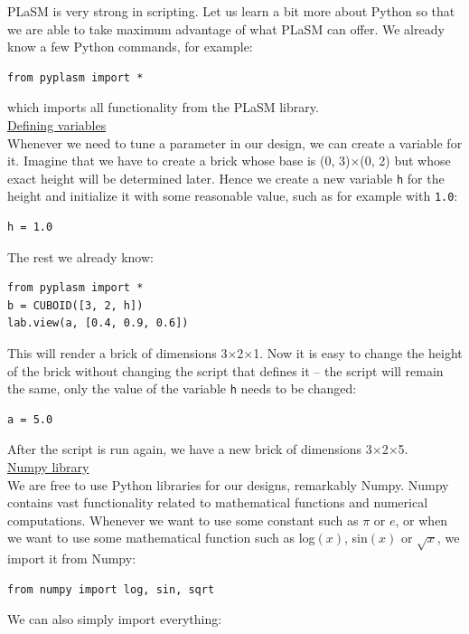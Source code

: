 \documentclass{article}
\begin{document}
PLaSM is very strong in scripting. Let us learn a bit 
more about Python so that we are able to take maximum advantage 
of what PLaSM can offer. We already know a few Python commands, 
for example:

\begin{verbatim}
from pyplasm import *
\end{verbatim} 
which imports all functionality from the PLaSM library.\\

\noindent
\underline{Defining variables}\\

\noindent
Whenever we need to tune a parameter in our design, we can create 
a variable for it. Imagine that we have to create a brick whose base
is (0, 3)$\times$(0, 2) but whose exact height will be determined 
later. Hence  we create a new variable {\tt h} for the height and initialize 
it with some reasonable value, such as for example with {\tt 1.0}:

\begin{verbatim}
h = 1.0
\end{verbatim} 
The rest we already know:

\begin{verbatim}
from pyplasm import *
b = CUBOID([3, 2, h])
lab.view(a, [0.4, 0.9, 0.6])
\end{verbatim} 
This will render a brick of dimensions 3$\times$2$\times$1. Now it is easy to 
change the height of the brick without changing the script that defines it --
the script will remain the same, only the value of the variable {\tt h} needs
to be changed:

\begin{verbatim}
a = 5.0
\end{verbatim} 
After the script is run again, we have a new brick of dimensions 3$\times$2$\times$5.\\

\noindent
\underline{Numpy library}\\

\noindent
We are free to use Python libraries for our designs, remarkably Numpy. 
Numpy contains vast functionality related to 
mathematical functions and numerical computations. Whenever we want 
to use some constant such as $\pi$ or $e$, or when we want to use some 
mathematical function such as log$(x)$, sin$(x)$ or $\sqrt{x}$, we
import it from Numpy:

\begin{verbatim}
from numpy import log, sin, sqrt
\end{verbatim} 
We can also simply import everything:
\end{document}
